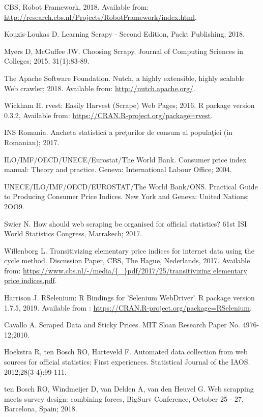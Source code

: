 \documentclass[]{article}
\begin{document}
\begin{thebibliography}{99}
CBS, Robot Framework, 2018. Available from: \url{http://research.cbs.nl/Projects/RobotFramework/index.html}.

Kouzis-Loukas D. Learning Scrapy - Second Edition, Packt Publishing; 2018.

Myers D, McGuffee JW. Choosing Scrapy. Journal of Computing Sciences in Colleges; 2015; 31(1):83-89.

The Apache Software Foundation. Nutch, a highly extensible, highly scalable Web crawler; 2018. Available from:
\url{http://nutch.apache.org/}.

Wickham H. rvest: Easily Harvest (Scrape) Web Pages; 2016, {R package version 0.3.2}, Available from:
\url{https://CRAN.R-project.org/package=rvest}.

INS Romania. Ancheta statistică a preţurilor de consum al populaţiei (in Romanian); 2017.

ILO/IMF/OECD/UNECE/Eurostat/The World Bank. Consumer price index manual: Theory and practice. Geneva: International Labour Office; 2004.

UNECE/ILO/IMF/OECD/EUROSTAT/The World Bank/ONS. Practical Guide to Producing Consumer Price Indices. New York and Geneva: United Nations; 2OO9.


Swier N. How should web scraping be organised for official statistics? 61st ISI World Statistics Congress, Marrakech; 2017.


Willenborg L. Transitivizing elementary price indices for internet data using the cycle method. Discussion Paper, CBS, The Hague, Nederlands, 2017. Available from: \url{https://www.cbs.nl/-/media/{\_}pdf/2017/25/transitivizing elementary price indices.pdf}.


Harrison J. RSelenium: R Bindings for 'Selenium WebDriver'. R package version 1.7.5, 2019. Available from :
\url{https://CRAN.R-project.org/package=RSelenium}.


Cavallo A. Scraped Data and Sticky Prices. MIT Sloan Research Paper No. 4976-12;2010.


Hoekstra R, ten Bosch RO, Harteveld F. Automated data collection from web sources for official statistics: First experiences. 
Statistical Journal of the IAOS. 2012;28(3-4):99-111.

ten Bosch RO, Windmeijer D, van Delden A, van den Heuvel G. Web scrapping meets survey design: combining forces,
BigSurv Conference, October 25 - 27, Barcelona, Spain; 2018.



\end{thebibliography}
\end{document}
